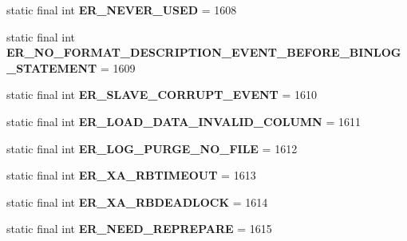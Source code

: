 \begin{DoxyCompactItemize}
static final int {\bfseries E\+R\+\_\+\+N\+E\+V\+E\+R\+\_\+\+U\+S\+ED} = 1608
\item 
\mbox{\label{classcom_1_1mysql_1_1jdbc_1_1_mysql_error_numbers_ae50ad269ad994faa370cbb589f821bb7}} 
static final int {\bfseries E\+R\+\_\+\+N\+O\+\_\+\+F\+O\+R\+M\+A\+T\+\_\+\+D\+E\+S\+C\+R\+I\+P\+T\+I\+O\+N\+\_\+\+E\+V\+E\+N\+T\+\_\+\+B\+E\+F\+O\+R\+E\+\_\+\+B\+I\+N\+L\+O\+G\+\_\+\+S\+T\+A\+T\+E\+M\+E\+NT} = 1609
\item 
\mbox{\label{classcom_1_1mysql_1_1jdbc_1_1_mysql_error_numbers_a40b2c1432aa24cd323eeaac56acd76ce}} 
static final int {\bfseries E\+R\+\_\+\+S\+L\+A\+V\+E\+\_\+\+C\+O\+R\+R\+U\+P\+T\+\_\+\+E\+V\+E\+NT} = 1610
\item 
\mbox{\label{classcom_1_1mysql_1_1jdbc_1_1_mysql_error_numbers_afb5e476838a707db7efa73394a807f40}} 
static final int {\bfseries E\+R\+\_\+\+L\+O\+A\+D\+\_\+\+D\+A\+T\+A\+\_\+\+I\+N\+V\+A\+L\+I\+D\+\_\+\+C\+O\+L\+U\+MN} = 1611
\item 
\mbox{\label{classcom_1_1mysql_1_1jdbc_1_1_mysql_error_numbers_ab016ba6f961655f54395031029fd083c}} 
static final int {\bfseries E\+R\+\_\+\+L\+O\+G\+\_\+\+P\+U\+R\+G\+E\+\_\+\+N\+O\+\_\+\+F\+I\+LE} = 1612
\item 
\mbox{\label{classcom_1_1mysql_1_1jdbc_1_1_mysql_error_numbers_ae58e38ed086913243a68c2c86bee8465}} 
static final int {\bfseries E\+R\+\_\+\+X\+A\+\_\+\+R\+B\+T\+I\+M\+E\+O\+UT} = 1613
\item 
\mbox{\label{classcom_1_1mysql_1_1jdbc_1_1_mysql_error_numbers_ae650c55ac2e66dd5880b325b59e1ae37}} 
static final int {\bfseries E\+R\+\_\+\+X\+A\+\_\+\+R\+B\+D\+E\+A\+D\+L\+O\+CK} = 1614
\item 
\mbox{\label{classcom_1_1mysql_1_1jdbc_1_1_mysql_error_numbers_a454d30b3516ce6d05277654606261f4c}} 
static final int {\bfseries E\+R\+\_\+\+N\+E\+E\+D\+\_\+\+R\+E\+P\+R\+E\+P\+A\+RE} = 1615

\end{DoxyCompactItemize}
